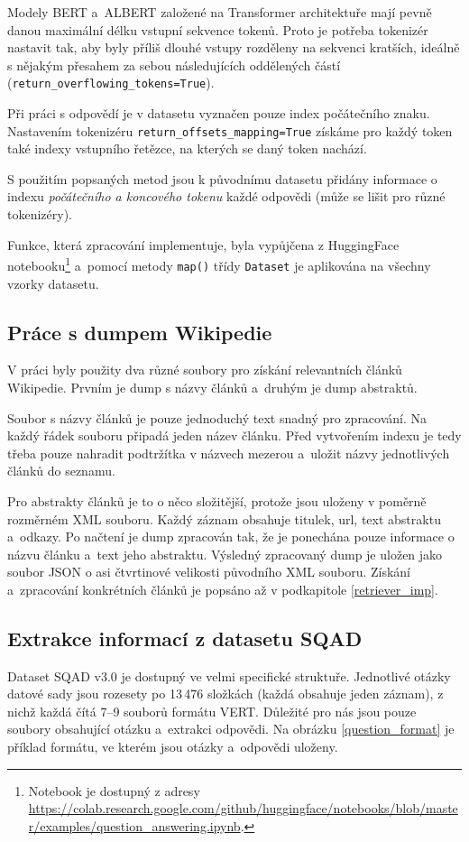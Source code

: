 Modely BERT a~ALBERT založené na Transformer architektuře mají pevně danou maximální délku vstupní sekvence tokenů. Proto je potřeba tokenizér nastavit tak, aby byly příliš dlouhé vstupy rozděleny na sekvenci kratších, ideálně s nějakým přesahem za sebou následujících oddělených částí (\texttt{return\_overflowing\_tokens=True}).\par
Při práci s odpovědí je v datasetu vyznačen pouze index počátečního znaku. Nastavením tokenizéru \texttt{return\_offsets\_mapping=True} získáme pro každý token také indexy vstupního řetězce, na kterých se daný token nachází.\par\pagebreak
S použitím popsaných metod jsou k původnímu datasetu přidány informace o indexu \emph{počátečního a koncového tokenu} každé odpovědi (může se lišit pro různé tokenizéry).\par 
Funkce, která zpracování implementuje, byla vypůjčena z HuggingFace notebooku\footnote{Notebook je dostupný z adresy \url{https://colab.research.google.com/github/huggingface/notebooks/blob/master/examples/question_answering.ipynb}.} a~pomocí metody \texttt{map()} třídy \texttt{Dataset} je aplikována na všechny vzorky datasetu.

\subsection{Práce s dumpem Wikipedie}
V práci byly použity dva různé soubory pro získání relevantních článků Wikipedie. Prvním je dump s názvy článků a~druhým je dump abstraktů.\par
Soubor s názvy článků je pouze jednoduchý text snadný pro zpracování. Na každý řádek souboru připadá jeden název článku. Před vytvořením indexu je tedy třeba pouze nahradit podtržítka v názvech mezerou a~uložit názvy jednotlivých článků do seznamu.\par
Pro abstrakty článků je to o něco složitější, protože jsou uloženy v poměrně rozměrném XML souboru. Každý záznam obsahuje titulek, url, text abstraktu a~odkazy. Po načtení je dump zpracován tak, že je ponechána pouze informace o názvu článku a~text jeho abstraktu. Výsledný zpracovaný dump je uložen jako soubor JSON o asi čtvrtinové velikosti původního XML souboru. Získání a~zpracování konkrétních článků je popsáno až v podkapitole \ref{retriever_imp}.

\subsection{Extrakce informací z datasetu SQAD}
Dataset SQAD v3.0 \cite{sqad_download} je dostupný ve velmi specifické struktuře. Jednotlivé otázky datové sady jsou rozesety po 13\,476 složkách (každá obsahuje jeden záznam), z nichž každá čítá \mbox{7--9} souborů formátu VERT. Důležité pro nás jsou pouze soubory obsahující otázku a~extrakci odpovědi. Na obrázku \ref{question_format} je příklad formátu, ve kterém jsou otázky a~odpovědi uloženy. 

